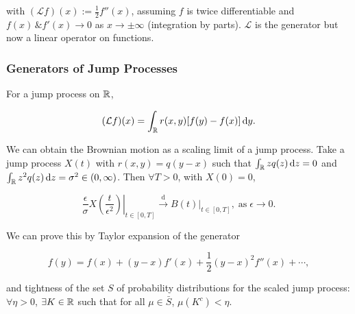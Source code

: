 with $(\mathcal{L}f)(x) := \frac{1}{2} f''(x)$, assuming $f$ is twice differentiable and $f(x) \, \& f'(x) \to 0$ as $x \to \pm \infty$ (integration by parts). $\mathcal{L}$ is the generator but now a linear operator on functions.

\subsubsection{Generators of Jump Processes}

For a jump process on $\mathbb{R}$, 

\begin{equation*}
    (\mathcal{L}f)(x) = \int_\mbb{R} r(x,y) [f(y) - f(x)] \dif y.
\end{equation*}

We can obtain the Brownian motion as a scaling limit of a jump process. Take a jump process $X(t)$ with $r(x, y) = q(y-x)$ such that $\int_\mbb{R} z q(z) \dif z = 0$ and $\int_\mbb{R} z^2 q(z) \dif z = \sigma^2 \in (0, \infty)$. Then $\forall T > 0$, with $X(0) = 0$,

\begin{equation*}
    \left. \frac{\epsilon}{\sigma} X(\frac{t}{\epsilon^2}) \right|_{t \in [0, T]} \xrightarrow{\text{d}} \left. B(t) \right|_{t \in [0, T]}, \; \text{as} \; \epsilon \to 0.
\end{equation*}

We can prove this by Taylor expansion of the generator 

\begin{equation*}
    f(y) = f(x) + (y-x) f'(x) + \frac{1}{2} (y-x)^2 f''(x) + \cdots,
\end{equation*}

and tightness of the set $S$ of probability distributions for the scaled jump process: $\forall \eta > 0$, $\exists K \in \mathbb{R}$ such that for all $\mu \in \bar{S}$, $\mu (K^c) < \eta$.
